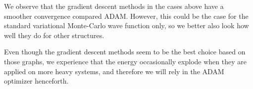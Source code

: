 We observe that the gradient descent methods in the cases above have a smoother convergence compared ADAM. However, this could be the case for the standard variational Monte-Carlo wave function only, so we better also look how well they do for other structures. 

Even though the gradient descent methods seem to be the best choice based on those graphs, we experience that the energy occasionally explode when they are applied on more heavy systems, and therefore we will rely in the ADAM optimizer henceforth. 

